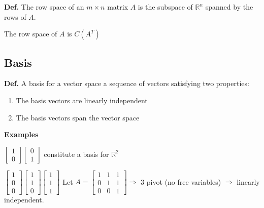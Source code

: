 \documentclass[12pt,a4paper]{article}
\begin{document}
\textbf{Def.} The \textcolor{orange!100}{row space} of an $m \times n$ matrix $A$ is the subspace of $\mathbb{R}^n$ spanned by the rows of $A$.

The row space of $A$ is $C(A^T)$

\subsection*{Basis}

\textbf{Def.} A \textcolor{orange!100}{basis} for a vector space a sequence of vectors satisfying two properties:

\begin{enumerate}
  \item The basis vectors are linearly independent
  \item The basis vectors span the vector space
\end{enumerate}

\textbf{Examples}

$
\begin{bmatrix}
  1 \\
  0
\end{bmatrix}
\begin{bmatrix}
  0 \\
  1
\end{bmatrix}
$ constitute a basis for $\mathbb{R}^2$

$
\begin{bmatrix}
  1 \\
  0 \\
  0
\end{bmatrix}
\begin{bmatrix}
  1 \\
  1 \\
  0
\end{bmatrix}
\begin{bmatrix}
  1 \\
  1 \\
  1
\end{bmatrix}
$ Let 
$
A = 
\begin{bmatrix}
  1 & 1 & 1 \\
  0 & 1 & 1 \\
  0 & 0 & 1
\end{bmatrix}
\Rightarrow
$ 3 pivot (no free variables) $\Rightarrow$ linearly independent.
\end{document}
